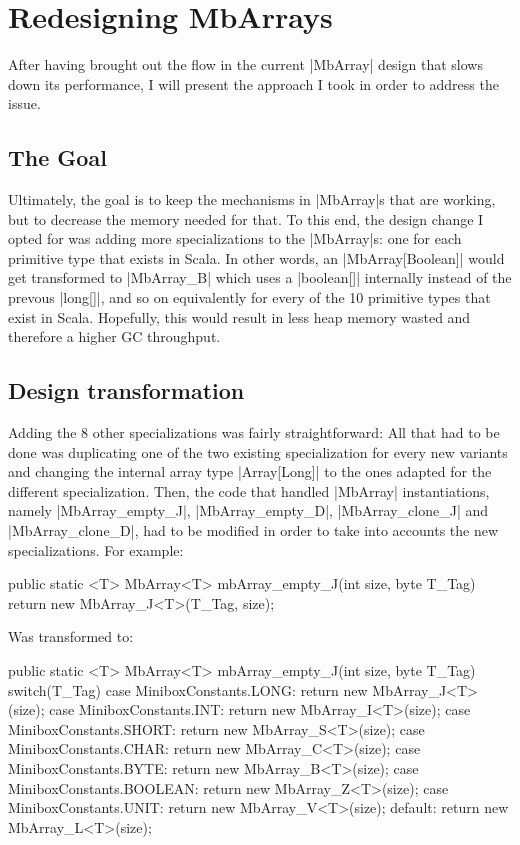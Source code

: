 \section{Redesigning MbArrays}
\label{sec:redesign}

After having brought out the flow in the current |MbArray| design that slows down its performance, I will present the approach I took in order to address the issue.

\subsection{The Goal}

Ultimately, the goal is to keep the mechanisms in |MbArray|s that are working, but to decrease the memory needed for that.
To this end, the design change I opted for was adding more specializations to the |MbArray|s: one for each primitive type that exists in Scala. In other words, an |MbArray[Boolean]| would get transformed to |MbArray_B| which uses a |boolean[]| internally instead of the prevous |long[]|, and so on equivalently for every of the 10 primitive types that exist in Scala. Hopefully, this would result in less heap memory wasted and therefore a higher GC throughput.

\subsection{Design transformation}

Adding the 8 other specializations was fairly straightforward: All that had to be done was duplicating one of the two existing specialization for every new variants and changing the internal array type |Array[Long]| to the ones adapted for the different specialization.
Then, the code that handled |MbArray| instantiations, namely |MbArray_empty_J|, |MbArray_empty_D|, |MbArray_clone_J| and |MbArray_clone_D|, had to be modified in order to take into accounts the new specializations.
For example:

\begin{lstlisting-nobreak-java}
public static <T> MbArray<T> mbArray_empty_J(int size, byte T_Tag) {
  return new MbArray_J<T>(T_Tag, size);
}
\end{lstlisting-nobreak-java}

Was transformed to:

\begin{lstlisting-nobreak-java}
public static <T> MbArray<T> mbArray_empty_J(int size, byte T_Tag) {
  switch(T_Tag) {
  case MiniboxConstants.LONG:
    return new MbArray_J<T>(size);
  case MiniboxConstants.INT:
    return new MbArray_I<T>(size);
  case MiniboxConstants.SHORT:
    return new MbArray_S<T>(size);
  case MiniboxConstants.CHAR:
    return new MbArray_C<T>(size);
  case MiniboxConstants.BYTE:
    return new MbArray_B<T>(size);
  case MiniboxConstants.BOOLEAN:
    return new MbArray_Z<T>(size);
  case MiniboxConstants.UNIT:
    return new MbArray_V<T>(size);
  default:
    return new MbArray_L<T>(size);
  }
}
\end{lstlisting-nobreak-java}

